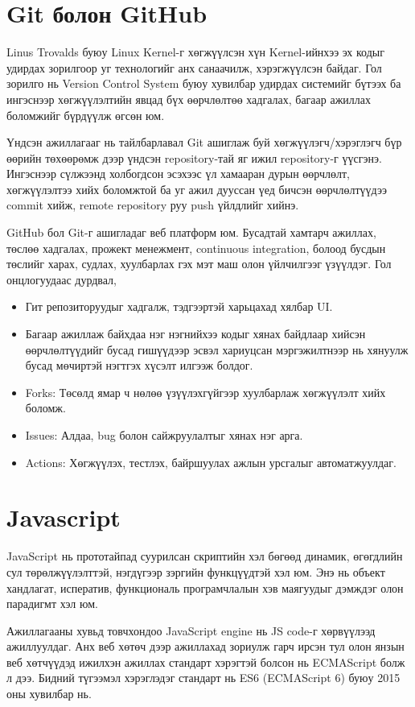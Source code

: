 \section{Git болон GitHub}
Linus Trovalds буюу Linux Kernel-г хөгжүүлсэн хүн Kernel-ийнхээ эх кодыг удирдах зорилгоор уг технологийг анх санаачилж, хэрэгжүүлсэн байдаг. Гол зорилго нь Version Control System буюу хувилбар удирдах системийг бүтээх ба ингэснээр хөгжүүлэлтийн явцад бүх өөрчлөлтөө хадгалах, багаар ажиллах боломжийг бүрдүүлж өгсөн юм.

Үндсэн ажиллагааг нь тайлбарлавал Git ашиглаж буй хөгжүүлэгч/хэрэглэгч бүр өөрийн төхөөрөмж дээр үндсэн repository-тай яг ижил repository-г үүсгэнэ. Ингэснээр сүлжээнд холбогдсон эсэхээс үл хамааран дурын өөрчлөлт, хөгжүүлэлтээ хийх боломжтой ба уг ажил дууссан үед бичсэн өөрчлөлтүүдээ commit хийж, remote repository руу push үйлдлийг хийнэ.

GitHub бол Git-г ашигладаг веб платформ юм. Бусадтай хамтарч ажиллах, төслөө хадгалах, прожект менежмент, continuous integration, болоод бусдын төслийг харах, судлах, хуулбарлах гэх мэт маш олон үйлчилгээг үзүүлдэг. Гол онцлогуудаас дурдвал,

\begin{itemize}
	\item Гит репозиторуудыг хадгалж, тэдгээртэй харьцахад хялбар UI.
	\item Багаар ажиллаж байхдаа нэг нэгнийхээ кодыг хянах байдлаар хийсэн өөрчлөлтүүдийг бусад гишүүдээр эсвэл хариуцсан мэргэжилтнээр нь хянуулж бусад мөчиртэй нэгтгэх хүсэлт илгээж болдог.
	\item Forks: Төсөлд ямар ч нөлөө үзүүлэхгүйгээр хуулбарлаж хөгжүүлэлт хийх боломж.
	\item Issues: Алдаа, bug болон сайжруулалтыг хянах нэг арга.
	\item Actions: Хөгжүүлэх, тестлэх, байршуулах ажлын урсгалыг автоматжуулдаг.
\end{itemize}

\section{Javascript}
\quad JavaScript нь прототайпад суурилсан скриптийн хэл бөгөөд динамик, өгөгдлийн сул төрөлжүүлэлттэй, нэгдүгээр зэргийн функцүүдтэй хэл юм. Энэ нь объект хандлагат, исператив, функциональ програмчлалын хэв маягуудыг дэмждэг олон парадигмт хэл юм.

Ажиллагааны хувьд товчхондоо JavaScript engine нь JS code-г хөрвүүлээд ажиллуулдаг. Анх веб хөтөч дээр ажиллахад зориулж гарч ирсэн тул олон янзын веб хөтчүүдэд ижилхэн ажиллах стандарт хэрэгтэй болсон нь ECMAScript болж л дээ. Бидний түгээмэл хэрэглэдэг стандарт нь ES6 (ECMAScript 6) буюу 2015 оны хувилбар нь.

